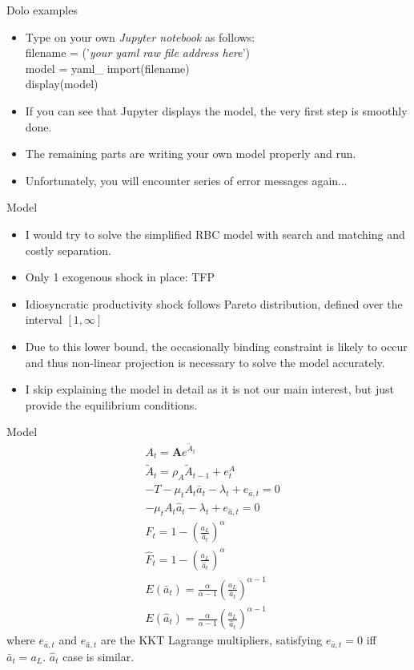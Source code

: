 \documentclass{beamer}
\begin{document}
\begin{frame}{Dolo examples}
\begin{itemize}
  
    \item Type on your own \textit{Jupyter notebook} as follows:\\
    
    filename = ('\textit{your yaml raw file address here}')\\
    model = yaml\_ import(filename)\\
    display(model)  

\item If you can see that Jupyter displays the model, the very first step is smoothly done. 
\item The remaining parts are writing your own model properly and run.
\item Unfortunately, you will encounter series of error messages again... 
\end{itemize}
\end{frame}

\begin{frame}{Model}
    \begin{itemize}
        \item I would try to solve the simplified RBC model with search and matching and costly separation. 
        \item Only 1 exogenous shock in place: TFP
        \item Idiosyncratic productivity shock follows Pareto distribution, defined over the interval $[1, \infty]$
        \item Due to this lower bound, the occasionally binding constraint is likely to occur and thus non-linear projection is necessary to solve the model accurately. 
        \item I skip explaining the model in detail as it is not our main interest, but just provide the equilibrium conditions. 
    \end{itemize}
\end{frame}
\begin{frame}{Model}
    \begin{align}
    & A_t=\textbf{A}e^{\tilde{A}_t}\\
    & \tilde{A}_t=\rho_A \tilde{A}_{t-1}+e_t^A\\
    &-T-\mu_tA_t\bar{a}_t-\lambda_t+e_{\bar{a},t}=0\\
    & -\mu_tA_t\hat{a}_t-\lambda_t+e_{\hat{a},t}=0\\
    &F_t=1-(\frac{a_L}{\bar{a}_t})^{\alpha}\\
    &\hat{F}_t=1-(\frac{a_L}{\hat{a}_t})^{\alpha}\\
    &E(\bar{a}_t)=\frac{\alpha}{\alpha-1}(\frac{a_L}{\bar{a}_t})^{\alpha-1}\\
    &E(\hat{a}_t)=\frac{\alpha}{\alpha-1}(\frac{a_L}{\hat{a}_t})^{\alpha-1}
      \end{align}
      where $e_{\bar{a},t}$ and $e_{\hat{a},t}$ are the KKT Lagrange multipliers, satisfying $e_{\bar{a},t}=0$ iff $\bar{a}_t=a_L$. $\hat{a}_t$ case is similar. 
\end{frame}
\end{document}
